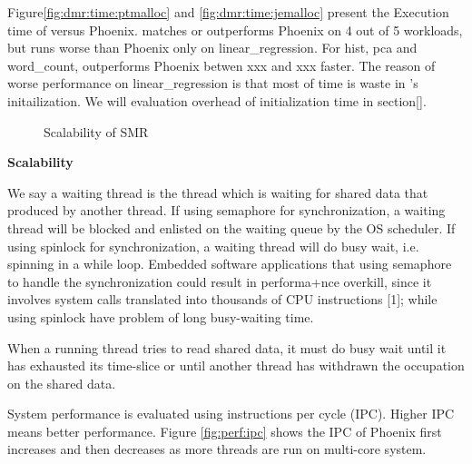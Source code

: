 Figure\ref{fig:dmr:time:ptmalloc} and \ref{fig:dmr:time:jemalloc}
present the Execution time of \myds versus Phoenix.
\myds matches or outperforms Phoenix on 4 out of 5 workloads,
but runs worse than Phoenix only on linear\_regression.
For hist, pca and word\_count, 
\myds outperforms Phoenix betwen xxx and xxx faster.
The reason of worse performance on linear\_regression 
is that most of time is waste in \myds's initailization.
We will evaluation overhead of initialization time in section\ref{}.



\begin{figure}[htpb]
\centering
  \caption{Scalability of SMR}
   \label{fig:scalability}
\end{figure}
{\bf Scalability}


We say a waiting thread is the thread which is waiting for shared
data that produced by another thread. If using semaphore for
synchronization, a waiting thread will be blocked and enlisted
on the waiting queue by the OS scheduler. If using spinlock
for synchronization, a waiting thread will do busy wait, i.e.
spinning in a while loop. Embedded software applications
that using semaphore to handle the synchronization could
result in performa+nce overkill, since it involves system calls
translated into thousands of CPU instructions [1]; while using
spinlock have problem of long busy-waiting time.

When a running thread tries to read shared data,
it must do busy wait until it has exhausted its time-slice
or until another thread has withdrawn the occupation on the
shared data. 




System performance is evaluated using
instructions per cycle (IPC). Higher IPC means
better performance.
Figure \ref{fig:perf:ipc} shows the IPC of Phoenix first increases 
and then decreases as more threads are run on multi-core system.


